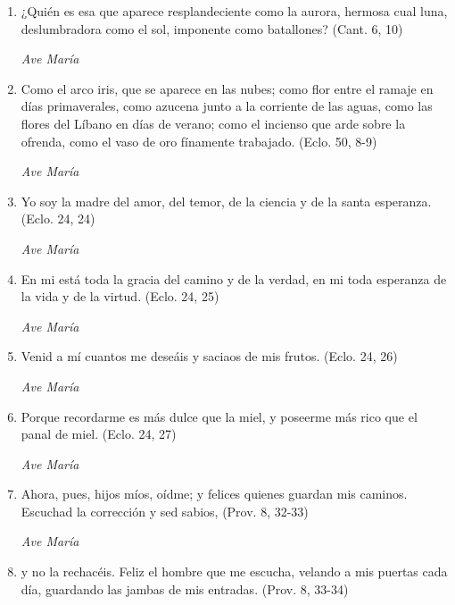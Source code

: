 \documentclass[a4paper,11pt, oneside]{report}
\begin{document}
        \begin{enumerate}

          \item ¿Quién es esa que aparece resplandeciente como la aurora,
          hermosa cual luna, deslumbradora como el sol, imponente como batallones? (Cant. 6, 10)

          \textit{Ave María}

          \item Como el arco iris, que se aparece en las nubes; como flor entre el ramaje en días primaverales, como azucena junto
          a la corriente de las aguas, como las flores del Líbano en días de verano; como el incienso que arde sobre la ofrenda,
          como el vaso de oro fínamente trabajado. (Eclo. 50, 8-9)

          \textit{Ave María}

          \item Yo soy la madre del amor, del temor, de la ciencia y de la santa esperanza. (Eclo. 24, 24)

          \textit{Ave María}

          \item En mi está toda la gracia del camino y de la verdad, en mi toda esperanza de la vida y de la virtud. (Eclo. 24, 25)

          \textit{Ave María}

          \item Venid a mí cuantos me deseáis y saciaos de mis frutos. (Eclo. 24, 26)

          \textit{Ave María}

          \item Porque recordarme es más dulce que la miel, y poseerme más rico que el panal de miel. (Eclo. 24, 27)

          \textit{Ave María}

          \item Ahora, pues, hijos míos, oídme; y felices quienes guardan mis caminos. Escuchad la corrección y sed sabios, (Prov. 8, 32-33)

          \textit{Ave María}

          \item y no la rechacéis. Feliz el hombre que me escucha, velando a mis puertas cada día,
          guardando las jambas de mis entradas. (Prov. 8, 33-34)


\end{enumerate}
\end{document}

